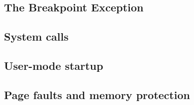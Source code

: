 \documentclass{article}
\begin{document}
\begin{CJK*}{UTF8}{gkai}
\subsection{The Breakpoint Exception}

\subsection{System calls}

\subsection{User-mode startup}

\subsection{Page faults and memory protection}




\begin{lstlisting}[style=console]
\end{lstlisting}

\begin{lstlisting}[style=console]
\end{lstlisting}

\begin{lstlisting}[style=console]
\end{lstlisting}






\begin{lstlisting}[style=ccode, title={\scriptsize \ttfamily \bfseries kern/env.c: env\_create()}]
\end{lstlisting}

\begin{lstlisting}[style=ccode, title={\scriptsize \ttfamily \bfseries kern/env.c: env\_create()}]
\end{lstlisting}

\begin{lstlisting}[style=ccode, title={\scriptsize \ttfamily \bfseries kern/env.c: env\_create()}]
\end{lstlisting}

\begin{lstlisting}[style=ccode, title={\scriptsize \ttfamily \bfseries kern/env.c: env\_create()}]
\end{lstlisting}








\end{CJK*}
\end{document}
